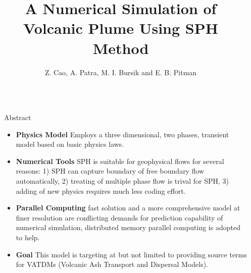 \documentclass[final]{beamer}
\title{A Numerical Simulation of Volcanic Plume Using SPH Method} %
\author{Z. Cao, A. Patra, M. I. Bursik and E. B. Pitman} %
\institute{University at Buffalo, SUNY} %
\newlength{\sepwid}
\newlength{\onecolwid}
\begin{document}

\setlength{\belowcaptionskip}{2ex} %
\setlength\belowdisplayshortskip{2ex} %

\begin{frame}[t] %

\begin{columns}[t] %

\begin{column}{\sepwid}\end{column} %

\begin{column}{\onecolwid} %


\begin{alertblock}{Abstract}
\begin{itemize}
\item \textbf{Physics Model} Employs a three dimensional, two phases, transient model based on basic physics laws.\
\item \textbf{Numerical Tools} SPH is suitable for geophysical flows for several reasons: 1) SPH can capture boundary of free boundary flow automatically, 2) treating of multiple phase flow is trival for SPH, 3) adding of new physics requires much less coding effort.\
\item \textbf{Parallel Computing} fast solution and a more comprehensive model at finer resolution are conflicting demands for prediction capability of numerical simulation, distributed memory parallel computing is adopted to help.
\item \textbf{Goal} This model is targeting at but not limited to providing source terms for VATDMs (Volcanic Ash Transport and Dispersal Models).
\end{itemize}
\end{alertblock}


\end{column}
\end{columns}
\end{frame}
\end{document}
